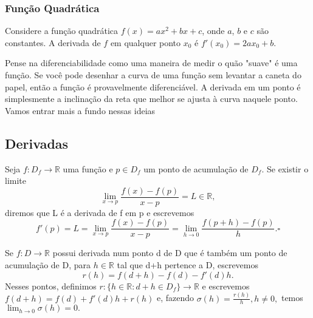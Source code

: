 \documentclass[analysis_notes.tex]{subfiles}
\begin{document}
\subsubsection{Função Quadrática}

Considere a função quadrática $f(x) = ax^2 + bx + c$, onde $a$, $b$ e $c$ são constantes. A derivada de $f$ em qualquer ponto $x_0$ é $f'(x_0) = 2ax_0 + b$.

Pense na diferenciabilidade como uma maneira de medir o quão "suave" é uma função. Se você pode desenhar a curva de uma função sem levantar a caneta do papel, então a função é provavelmente diferenciável. A derivada em um ponto é simplesmente a inclinação da reta que melhor se ajusta à curva naquele ponto.
Vamos entrar mais a fundo nessas ideias

\subsection{Derivadas}
\begin{def*}
	Seja \(f:D_{f}\rightarrow \mathbb{R}\) uma fun\c cão e \(p\in D_{f}\) um ponto de
	acumula\c cão de \(D_{f}\). Se existir o limite
	\[
		\lim_{x\to p}\frac{f(x)-f(p)}{x-p} = L\in \mathbb{R},
	\]
	diremos que L é a derivada de f em p e escrevemos
	\[
		f'(p) = L = \lim_{x\to p}\frac{f(x)-f(p)}{x-p}=\lim_{h\to 0}\frac{f(p+h)-f(p)}{h}. \square
	\]
\end{def*}

Se \(f:D\rightarrow \mathbb{R}\) possui derivada num ponto d de D que é também um
ponto de acumula\c cão de D, para \(h\in \mathbb{R}\) tal que d+h pertence a D, escrevemos
\[
	r(h) = f(d+h)-f(d)-f'(d)h.
\]
Nesses pontos, definimos \(r:\{h\in \mathbb{R}: d+h\in D_{f}\}\rightarrow \mathbb{R}\)
e escrevemos \(f(d+h) = f(d)+f'(d)h + r(h)\) e, fazendo \(\sigma (h) = \frac{r(h)}{h}, h\neq 0,\)
temos \(\lim_{h\to 0}\sigma (h)=0.\)
\end{document}
